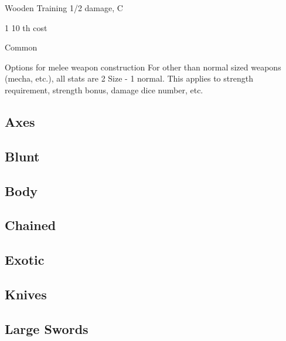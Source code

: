 \documentclass[twoside]{book}
\begin{document}
                  
                   Wooden Training 
                   1/2 damage, C 
                        
                             1  10
                              th 
                           cost     
                    
                   Common   
                  
                
                Options for melee weapon construction
              For other than normal sized weapons (mecha, etc.),
               all stats are 
                     2      Size    -
                      1   
                     normal. This applies to strength
                  requirement, strength bonus, damage dice number, etc.
            
\subsection{Axes}
    
\subsection{Blunt}
    
\subsection{Body}
    
\subsection{Chained}
    
\subsection{Exotic}
    
\subsection{Knives}
    
\subsection{Large Swords}
    
\end{document}
